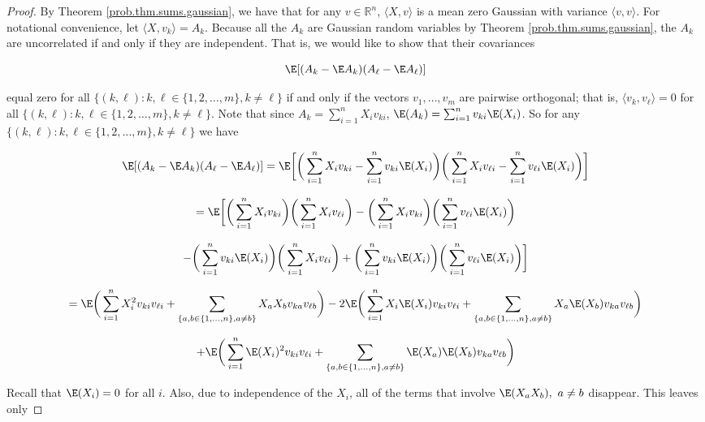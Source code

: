 \begin{proof} By Theorem \ref{prob.thm.sums.gaussian}, we have that for any $v\in\mathbb{R}^{n}$, $\langle X, v\rangle$ is a mean zero Gaussian with variance $\langle v,v\rangle$. For notational convenience, let \(\langle X, v_k \rangle = A_k\). Because all the \( A_k \) are Gaussian random variables by Theorem \ref{prob.thm.sums.gaussian}, the \(A_k\) are uncorrelated if and only if they are independent. That is, we would like to show that their covariances


\[
\E[(A_k - \E A_k)(A_\ell - \E A_\ell)] 
\]

equal zero for all \( \{(k, \ell) : k, \ell \in \{1, 2, \ldots, m\}, k \neq \ell \}\) if and only if the vectors $v_1,\dots,v_m$ are pairwise orthogonal; that is, \(\langle v_k, v_\ell \rangle = 0 \) for all \( \{(k, \ell) : k, \ell \in \{1, 2, \ldots, m\}, k \neq \ell \}\). Note that since \(A_k = \sum_{i=1}^n X_i v_{ki}\), \(\E (A_k) =   \sum_{i=1}^n  v_{ki} \E(X_i)\). So for any \( \{(k, \ell) : k, \ell \in \{1, 2, \ldots, m\}, k \neq \ell \}\) we have

\[
\E[(A_k - \E A_k)(A_\ell - \E A_\ell)] = \E \bigg[ \bigg( \sum_{i=1}^n X_i v_{ki} -   \sum_{i=1}^n  v_{ki} \E(X_i) \bigg) \bigg(\sum_{i=1}^n X_i v_{\ell i} -   \sum_{i=1}^n  v_{\ell i} \E(X_i) \bigg) \bigg] 
\]

\[
= \E \bigg[ \bigg( \sum_{i=1}^n X_i v_{ki} \bigg)  \bigg(\sum_{i=1}^n X_i v_{\ell i} \bigg) -  \bigg( \sum_{i=1}^n X_i v_{ki} \bigg) \bigg( \sum_{i=1}^n  v_{\ell i} \E(X_i) \bigg)   
\]

\[
-   \bigg( \sum_{i=1}^n  v_{ki} \E(X_i) \bigg) \bigg(\sum_{i=1}^n X_i v_{\ell i} \bigg)  +    \bigg( \sum_{i=1}^n  v_{ki} \E(X_i) \bigg)  \bigg(  \sum_{i=1}^n  v_{\ell i} \E(X_i) \bigg) \bigg] 
\]




\[
= \E \bigg(  \sum_{i=1}^n X_i^2 v_{ki} v_{\ell i} + \sum_{\{a, b \in \{1, \ldots, n\}, a \neq b \} }   X_a X_b v_{ka}  v_{\ell b}\bigg)
-  2 \E \bigg(  \sum_{i=1}^n X_i \E(X_i) v_{ki} v_{\ell i} + \sum_{\{a, b \in \{1, \ldots, n\}, a \neq b\} }   X_a \E(X_b) v_{ka}  v_{\ell b} \bigg)   
\]

\[  
+   \E  \bigg(  \sum_{i=1}^n \E(X_i)^2 v_{ki} v_{\ell i} + \sum_{\{a, b \in \{1, \ldots, n\},a \neq b \} }   \E(X_a) \E(X_b) v_{ka}  v_{\ell b} \bigg)
\]

Recall that \(\E(X_i)= 0\) for all \(i\). Also, due to independence of the \(X_i\), all of the terms that involve \(\E (X_a X_b), \ a \neq b\) disappear. This leaves only


\end{proof}

